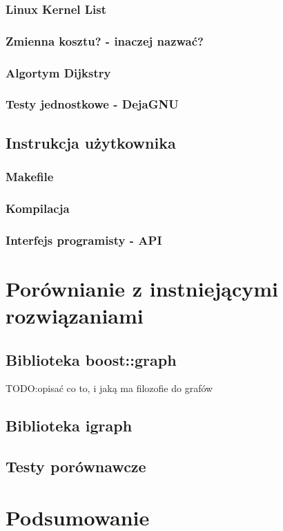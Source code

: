 \documentclass[a4paper,12pt]{thesis}
\begin{document}
\subsection{Linux Kernel List}
\subsection{Zmienna kosztu? - inaczej nazwać?}
\subsection{Algortym Dijkstry}
\subsection{Testy jednostkowe - DejaGNU}
\section{Instrukcja użytkownika}
\subsection{Makefile}
\subsection{Kompilacja}
\subsection{Interfejs programisty - API}
\chapter{Porównianie z instniejącymi rozwiązaniami}
\section{Biblioteka boost::graph}
TODO:opisać co to, i jaką ma filozofie do grafów
\section{Biblioteka igraph}
\section{Testy porównawcze}

\chapter*{Podsumowanie}
\end{document}
